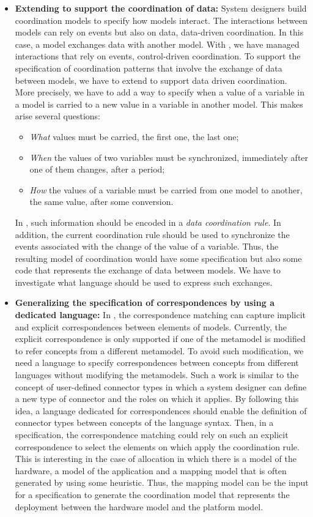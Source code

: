 \begin{itemize}
	\item \textbf{Extending \bcool to support the coordination of data:} System designers build coordination models to specify how models interact. The interactions between models can rely on events but also on data, \ie data-driven coordination. In this case, a model exchanges data with another model. With \bcool, we have managed interactions that rely on events, \ie control-driven coordination. To support the specification of coordination patterns that involve the exchange of data between models, we have to extend \bcool to support data driven coordination. More precisely, we have to add a way to specify when a value of a variable in a model is carried to a new value in a variable in another model. This makes arise several questions:
			\begin{itemize}
				\item \emph{What} values must be carried, \eg the first one, the last one;
				\item \emph{When} the values of two variables must be synchronized, \eg immediately after one of them changes, after a period;
				\item \emph{How} the values of a variable must be carried from one model to another, \eg the same value, after some conversion. 
			\end{itemize}
	In \bcool, such information should be encoded in a \emph{data coordination rule}. In addition, the current coordination rule should be used to synchronize the events associated with the change of the value of a variable. Thus, the resulting model of coordination would have some \ccsl specification but also some code that represents the exchange of data between models. We have to investigate what language should be used to express such exchanges. %
	\item \textbf{Generalizing the specification of correspondences by using a dedicated language:} In \bcool, the correspondence matching can capture implicit and explicit correspondences between elements of models. Currently, the explicit correspondence is only supported if one of the metamodel is modified to refer concepts from a different metamodel. To avoid such modification, we need a language to specify correspondences between concepts from different languages without modifying the metamodels. Such a work is similar to the concept of user-defined connector types in which a system designer can define a new type of connector and the roles on which it applies. By following this idea, a language dedicated for correspondences should enable the definition of connector types between concepts of the language syntax. Then, in a \bcool specification, the correspondence matching could rely on such an explicit correspondence to select the elements on which apply the coordination rule. This is interesting in the case of allocation in which there is a model of the hardware, a model of the application and a mapping model that is often generated by using some heuristic. Thus, the mapping model can be the input for a \bcool specification to generate the coordination model that represents the deployment between the hardware model and the platform model.

\end{itemize}
